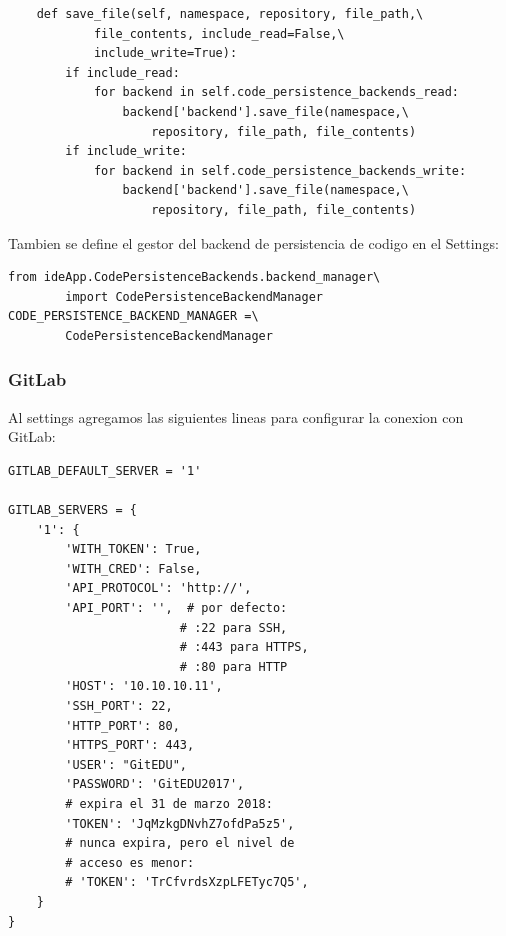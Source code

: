 \begin{lstlisting}
    def save_file(self, namespace, repository, file_path,\
            file_contents, include_read=False,\
            include_write=True):
        if include_read:
            for backend in self.code_persistence_backends_read:
                backend['backend'].save_file(namespace,\
                    repository, file_path, file_contents)
        if include_write:
            for backend in self.code_persistence_backends_write:
                backend['backend'].save_file(namespace,\
                    repository, file_path, file_contents)
\end{lstlisting}
\lstset{language=Bash}

Tambien se define el gestor del backend de persistencia de codigo en el Settings:
\lstset{language=Python}
\begin{lstlisting}
from ideApp.CodePersistenceBackends.backend_manager\
        import CodePersistenceBackendManager
CODE_PERSISTENCE_BACKEND_MANAGER =\
        CodePersistenceBackendManager
\end{lstlisting}
\lstset{language=Bash}


\subsubsection{GitLab}
Al settings agregamos las siguientes lineas para configurar la conexion con GitLab:
\lstset{language=Python}
\begin{lstlisting}
GITLAB_DEFAULT_SERVER = '1'

GITLAB_SERVERS = {
    '1': {
        'WITH_TOKEN': True,
        'WITH_CRED': False,
        'API_PROTOCOL': 'http://',
        'API_PORT': '',  # por defecto:
                        # :22 para SSH,
                        # :443 para HTTPS,
                        # :80 para HTTP
        'HOST': '10.10.10.11',
        'SSH_PORT': 22,
        'HTTP_PORT': 80,
        'HTTPS_PORT': 443,
        'USER': "GitEDU",
        'PASSWORD': 'GitEDU2017',
        # expira el 31 de marzo 2018:
        'TOKEN': 'JqMzkgDNvhZ7ofdPa5z5',
        # nunca expira, pero el nivel de 
        # acceso es menor:
        # 'TOKEN': 'TrCfvrdsXzpLFETyc7Q5',  
    }
}
\end{lstlisting}
\lstset{language=Bash}

